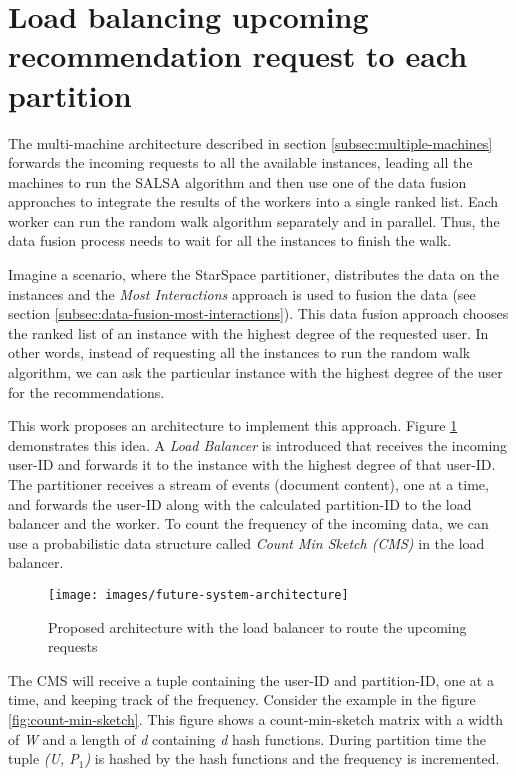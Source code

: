 \section{Load balancing upcoming recommendation request to each partition}
\label{sec:load-balancing}
The multi-machine architecture described in section \ref{subsec:multiple-machines} forwards the incoming requests to all the available instances, leading all the machines to run the SALSA algorithm and then use one of the data fusion approaches to integrate the results of the workers into a single ranked list. Each worker can run the random walk algorithm separately and in parallel. Thus, the data fusion process needs to wait for all the instances to finish the walk.


Imagine a scenario, where the StarSpace partitioner, distributes the data on the instances and the \emph{Most Interactions} approach is used to fusion the data (see section \ref{subsec:data-fusion-most-interactions}). This data fusion approach chooses the ranked list of an instance with the highest degree of the requested user. In other words, instead of requesting all the instances to run the random walk algorithm, we can ask the particular instance with the highest degree of the user for the recommendations.


This work proposes an architecture to implement this approach. Figure \ref{fig:loadbalancer} demonstrates this idea. A \emph{Load Balancer} is introduced that receives the incoming user-ID and forwards it to the instance with the highest degree of that user-ID. The partitioner receives a stream of events (document content), one at a time, and forwards the user-ID along with the calculated partition-ID to the load balancer and the worker. To count the frequency of the incoming data, we can use a probabilistic data structure called \emph{Count Min Sketch (CMS)} \cite{cormodeImprovedDataStream2005} in the load balancer.


\begin{figure}[!h]
    \centering
    \texttt{[image: images/future-system-architecture]}
    \caption{Proposed architecture with the load balancer to route the upcoming requests}
    \label{fig:loadbalancer}
\end{figure}


The CMS will receive a tuple containing the user-ID and partition-ID, one at a time, and keeping track of the frequency. Consider the example in the figure \ref{fig:count-min-sketch}. This figure shows a count-min-sketch matrix with a width of \emph{W} and a length of \emph{d} containing \emph{d} hash functions. During partition time the tuple \emph{(\emph{U}, \emph{P$_1$})} is hashed by the hash functions and the frequency is incremented.

